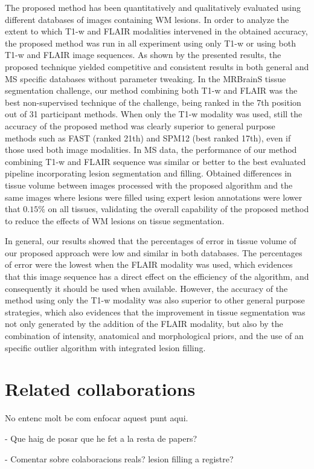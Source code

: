 The proposed method has been quantitatively and qualitatively evaluated using different databases of images containing WM lesions. In order to analyze the extent to which T1-w and FLAIR modalities intervened in the obtained accuracy, the proposed method was run in all experiment using only T1-w or using both T1-w and FLAIR image sequences. As shown by the presented results, the proposed technique yielded competitive and consistent results in both general and MS specific databases without parameter tweaking. In the MRBrainS tissue segmentation challenge, our method combining both T1-w and FLAIR was the best non-supervised technique of the challenge, being ranked in the 7th position out of 31 participant methods. When only the T1-w modality was used, still the accuracy of the proposed method was clearly superior to general purpose methods such as FAST (ranked 21th) and SPM12 (best ranked 17th), even if those used both image modalities. In MS data, the performance of our method combining T1-w and FLAIR sequence was similar or better to the best evaluated pipeline incorporating lesion segmentation and filling. Obtained differences in tissue volume between images processed with the proposed algorithm and the same images where lesions were filled using expert lesion annotations were lower that $0.15\%$ on all tissues, validating the overall capability of the proposed method to reduce the effects of WM lesions on tissue segmentation. 

In general, our results showed that the percentages of error in tissue volume of our proposed approach were low and similar in both databases. The percentages of error were the lowest when the FLAIR modality was used, which evidences that this image sequence has a direct effect on the efficiency of the algorithm, and consequently it should be used when available. However, the accuracy of the method using only the T1-w modality was also superior to other general purpose strategies, which also evidences that the improvement in tissue segmentation was not only generated by the addition of the FLAIR modality, but also by the combination of intensity, anatomical and morphological priors, and the use of an specific outlier algorithm with integrated lesion filling.


\section{Related collaborations}

No entenc molt be com enfocar aquest punt aqui. 

- Que haig de posar que he fet a la resta de papers? 

- Comentar sobre colaboracions reals? lesion filling a registre?

